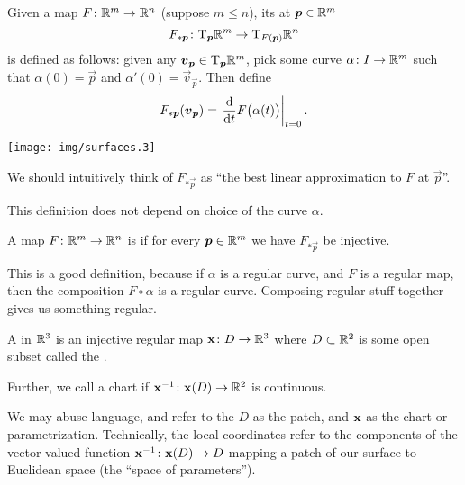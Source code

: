 \begin{definition}\label{defn:euclidean-space:tangent-map}
Given a map $F\colon \mathbb{R}^{m}\to\mathbb{R}^{n}$ (suppose $m\leq n$), its
 at $\boldsymbol{p}\in\mathbb{R}^{m}$
\begin{equation*}
F_{*\boldsymbol{p}}\colon\mathrm{T}_{\boldsymbol{p}}\mathbb{R}^{m}\to\mathrm{T}_{F(\boldsymbol{p})}\mathbb{R}^{n}
\end{equation*}
is defined as follows: given any $\boldsymbol{v}_{\boldsymbol{p}}\in\mathrm{T}_{\boldsymbol{p}}\mathbb{R}^{m}$,
pick some curve $\alpha\colon I\to\mathbb{R}^{m}$ such that $\alpha(0)=\vec{p}$
and $\alpha'(0) = \vec{v}_{\vec{p}}$. Then define
\begin{equation}
F_{*\boldsymbol{p}}(\boldsymbol{v}_{\boldsymbol{p}}) = \left.\frac{\mathrm{d}}{\mathrm{d} t}F\bigl(\alpha(t)\bigr)\right|_{t=0}.
\end{equation}
\begin{center}
  \texttt{[image: img/surfaces.3]}
\end{center}
\end{definition}

\begin{remark}
We should intuitively think of $F_{*\vec{p}}$ as ``the best linear
approximation to $F$ at $\vec{p}$''.
\end{remark}

\begin{remark}
This definition does not depend on choice of the curve $\alpha$.
\end{remark}

\begin{definition}
A map $F\colon\mathbb{R}^{m}\to\mathbb{R}^{n}$ is  if for every
$\boldsymbol{p}\in\mathbb{R}^{m}$ we have $F_{*\vec{p}}$ be injective.
\end{definition}

\begin{remark}
This is a good definition, because if $\alpha$ is a regular curve, and
$F$ is a regular map, then the composition $F\circ\alpha$ is a regular
curve. Composing regular stuff together gives us something regular.
\end{remark}

\begin{definition}
A  in $\mathbb{R}^{3}$ is an injective regular map
$\mathbf{x}\colon D\to\mathbb{R}^{3}$ where $D\subset\mathbb{R}^{2}$ is some open
subset called the .

Further, we call a chart  if $\mathbf{x}^{-1}\colon\mathbf{x}(D)\to\mathbb{R}^{2}$
is continuous.

We may abuse language, and refer to the $D$ as the patch, and
$\mathbf{x}$ as the chart or parametrization. Technically, the local
coordinates refer to the components of the vector-valued function
$\mathbf{x}^{-1}\colon\mathbf{x}(D)\to D$ mapping a patch of our surface
to Euclidean space (the ``space of parameters'').
\end{definition}

